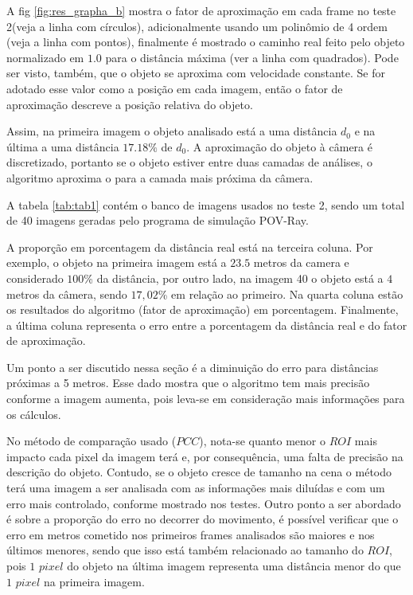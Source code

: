 A fig \ref{fig:res_grapha_b} mostra o fator de aproximação em cada frame
no teste 2(veja a linha com círculos), adicionalmente usando um polinômio 
de 4 ordem (veja a linha com pontos), finalmente é mostrado o caminho real feito
pelo objeto normalizado em $1.0$ para o distância máxima (ver a linha com quadrados).
Pode ser visto, também, que o objeto se aproxima com velocidade constante.
Se for adotado esse valor como a posição em cada imagem, então o fator de aproximação
descreve a posição relativa do objeto.

Assim, na primeira imagem o objeto analisado está a uma distância $d_0$
e na última a uma distância $17.18\%$ de $d_0$.
A aproximação do objeto à câmera é discretizado, portanto se o objeto
estiver entre duas camadas de análises, o algoritmo aproxima o para
a camada mais próxima da câmera.

A tabela \ref{tab:tab1} contém o banco de imagens usados no teste 2, sendo um total de 40 imagens geradas
pelo programa de simulação POV-Ray.

A proporção em porcentagem da distância real está na terceira coluna. Por exemplo, o objeto na primeira imagem
está a $23.5$ metros da camera e considerado $100$\% da distância, por outro lado, na imagem 40 o objeto está a
$4$ metros da câmera, sendo $17,02$\% em relação ao primeiro. Na quarta coluna estão os resultados do algoritmo (fator
de aproximação) em porcentagem. Finalmente, a última coluna representa o erro entre a porcentagem da distância real e do
fator de aproximação.

Um ponto a ser discutido nessa seção é a diminuição do erro para distâncias próximas a 5 metros. Esse dado 
mostra que o algoritmo tem mais precisão conforme a imagem aumenta, pois leva-se em consideração mais informações
para os cálculos.

No método de comparação usado ($PCC$), nota-se quanto menor o $ROI$ mais impacto cada pixel da imagem
terá e, por consequência, uma falta de precisão na descrição do objeto. Contudo, se o objeto cresce de tamanho na cena
o método terá uma imagem a ser analisada com as informações mais diluídas e com um erro mais controlado, conforme
mostrado nos testes. Outro ponto a ser abordado é sobre a proporção do erro no decorrer do movimento, é possível
verificar que o erro em metros cometido nos primeiros frames analisados são maiores e nos últimos menores, sendo que
isso está também relacionado ao tamanho do $ROI$, pois $1$ $pixel$ do objeto na última imagem representa uma distância
menor do que $1$ $pixel$ na primeira imagem. 


